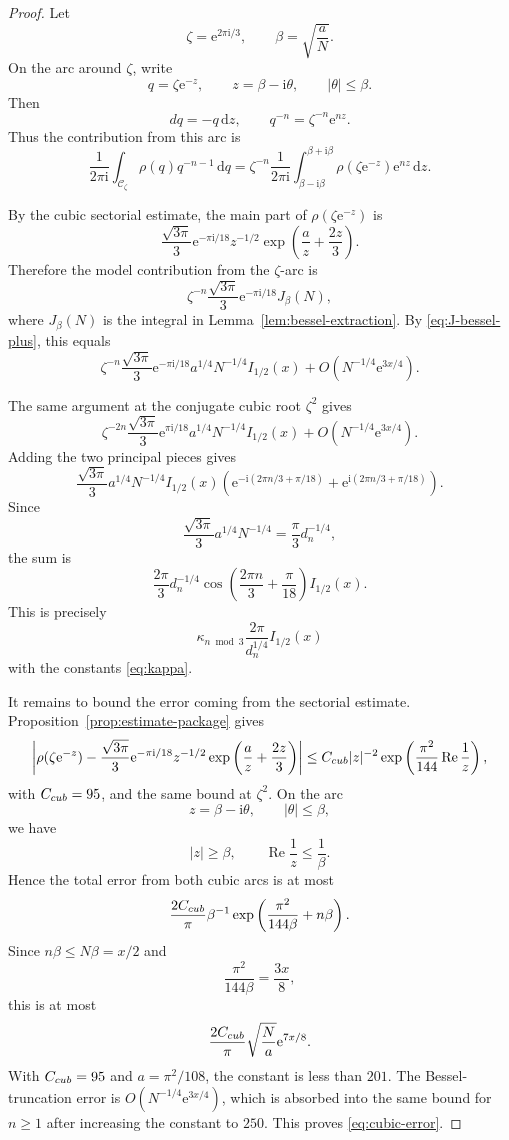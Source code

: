 \documentclass[10pt,a4paper]{amsart}
\newcommand{\ii}{\mathrm i}
\newcommand{\e}{\mathrm e}
\newcommand{\dd}{\mathrm d}
\newcommand{\Repart}{\operatorname{Re}}
\begin{document}
\begin{proof}
Let
\[
\zeta=\e^{2\pi\ii/3},
\qquad
\beta=\sqrt{\frac{a}{N}}.
\]
On the arc around $\zeta$, write
\[
q=\zeta\e^{-z},
\qquad
z=\beta-\ii\theta,
\qquad
|\theta|\leq\beta.
\]
Then
\[
dq=-q\,\dd z,
\qquad
q^{-n}=\zeta^{-n}\e^{nz}.
\]
Thus the contribution from this arc is
\[
\frac1{2\pi\ii}
\int_{\mathcal C_\zeta}
\rho(q)q^{-n-1}\,\dd q
=
\zeta^{-n}
\frac1{2\pi\ii}
\int_{\beta-\ii\beta}^{\beta+\ii\beta}
\rho(\zeta\e^{-z})\e^{nz}\,\dd z.
\]

By the cubic sectorial estimate, the main part of $\rho(\zeta\e^{-z})$ is
\[
\frac{\sqrt{3\pi}}3
\e^{-\pi\ii/18}
z^{-1/2}
\exp\left(\frac{a}{z}+\frac{2z}{3}\right).
\]
Therefore the model contribution from the $\zeta$-arc is
\[
\zeta^{-n}
\frac{\sqrt{3\pi}}3
\e^{-\pi\ii/18}
J_\beta(N),
\]
where $J_\beta(N)$ is the integral in Lemma~\ref{lem:bessel-extraction}. By \eqref{eq:J-bessel-plus}, this equals
\[
\zeta^{-n}
\frac{\sqrt{3\pi}}3
\e^{-\pi\ii/18}
a^{1/4}N^{-1/4}I_{1/2}(x)
+
O\left(N^{-1/4}\e^{3x/4}\right).
\]

The same argument at the conjugate cubic root $\zeta^2$ gives
\[
\zeta^{-2n}
\frac{\sqrt{3\pi}}3
\e^{\pi\ii/18}
a^{1/4}N^{-1/4}I_{1/2}(x)
+
O\left(N^{-1/4}\e^{3x/4}\right).
\]
Adding the two principal pieces gives
\[
\frac{\sqrt{3\pi}}3
a^{1/4}N^{-1/4}
I_{1/2}(x)
\left(
\e^{-\ii(2\pi n/3+\pi/18)}
+
\e^{\ii(2\pi n/3+\pi/18)}
\right).
\]
Since
\[
\frac{\sqrt{3\pi}}3a^{1/4}N^{-1/4}
=
\frac{\pi}{3}d_n^{-1/4},
\]
the sum is
\[
\frac{2\pi}{3}d_n^{-1/4}
\cos\left(\frac{2\pi n}{3}+\frac\pi{18}\right)
I_{1/2}(x).
\]
This is precisely
\[
\kappa_{n\bmod3}
\frac{2\pi}{d_n^{1/4}}I_{1/2}(x)
\]
with the constants \eqref{eq:kappa}.

It remains to bound the error coming from the sectorial estimate. Proposition~\ref{prop:estimate-package} gives
\[
\left|
\rho(\zeta\e^{-z})
-
\frac{\sqrt{3\pi}}3
\e^{-\pi\ii/18}
z^{-1/2}
\exp\left(\frac{a}{z}+\frac{2z}{3}\right)
\right|
\leq
C_{\rm cub}|z|^{-2}
\exp\left(\frac{\pi^2}{144}\Repart\frac1z\right),
\]
with $C_{\rm cub}=95$, and the same bound at $\zeta^2$. On the arc
\[
z=\beta-\ii\theta,
\qquad
|\theta|\leq\beta,
\]
we have
\[
|z|\geq\beta,
\qquad
\Repart\frac1z\leq\frac1\beta.
\]
Hence the total error from both cubic arcs is at most
\[
\frac{2C_{\rm cub}}{\pi}\beta^{-1}
\exp\left(\frac{\pi^2}{144\beta}+n\beta\right).
\]
Since $n\beta\leq N\beta=x/2$ and
\[
\frac{\pi^2}{144\beta}=\frac{3x}{8},
\]
this is at most
\[
\frac{2C_{\rm cub}}{\pi}\sqrt{\frac{N}{a}}\e^{7x/8}.
\]
With $C_{\rm cub}=95$ and $a=\pi^2/108$, the constant is less than $201$. The Bessel-truncation error is $O(N^{-1/4}\e^{3x/4})$, which is absorbed into the same bound for $n\geq1$ after increasing the constant to $250$. This proves \eqref{eq:cubic-error}.
\end{proof}
\end{document}
